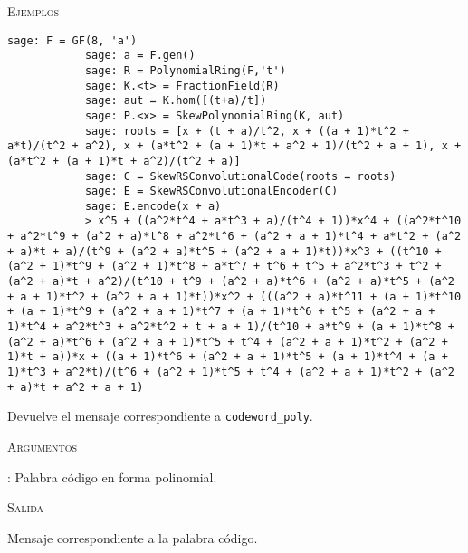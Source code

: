 \begin{description}[leftmargin=1em, font=\normalfont\ttfamily, style=nextline]
\begin{description}[font=\ttfamily,style=nextline]
        \textsc{Ejemplos}

        \begin{lstlisting}[gobble=10]
            sage: F = GF(8, 'a')
            sage: a = F.gen()
            sage: R = PolynomialRing(F,'t')
            sage: K.<t> = FractionField(R)
            sage: aut = K.hom([(t+a)/t])
            sage: P.<x> = SkewPolynomialRing(K, aut)
            sage: roots = [x + (t + a)/t^2, x + ((a + 1)*t^2 + a*t)/(t^2 + a^2), x + (a*t^2 + (a + 1)*t + a^2 + 1)/(t^2 + a + 1), x + (a*t^2 + (a + 1)*t + a^2)/(t^2 + a)]
            sage: C = SkewRSConvolutionalCode(roots = roots) 
            sage: E = SkewRSConvolutionalEncoder(C)
            sage: E.encode(x + a)
            > x^5 + ((a^2*t^4 + a*t^3 + a)/(t^4 + 1))*x^4 + ((a^2*t^10 + a^2*t^9 + (a^2 + a)*t^8 + a^2*t^6 + (a^2 + a + 1)*t^4 + a*t^2 + (a^2 + a)*t + a)/(t^9 + (a^2 + a)*t^5 + (a^2 + a + 1)*t))*x^3 + ((t^10 + (a^2 + 1)*t^9 + (a^2 + 1)*t^8 + a*t^7 + t^6 + t^5 + a^2*t^3 + t^2 + (a^2 + a)*t + a^2)/(t^10 + t^9 + (a^2 + a)*t^6 + (a^2 + a)*t^5 + (a^2 + a + 1)*t^2 + (a^2 + a + 1)*t))*x^2 + (((a^2 + a)*t^11 + (a + 1)*t^10 + (a + 1)*t^9 + (a^2 + a + 1)*t^7 + (a + 1)*t^6 + t^5 + (a^2 + a + 1)*t^4 + a^2*t^3 + a^2*t^2 + t + a + 1)/(t^10 + a*t^9 + (a + 1)*t^8 + (a^2 + a)*t^6 + (a^2 + a + 1)*t^5 + t^4 + (a^2 + a + 1)*t^2 + (a^2 + 1)*t + a))*x + ((a + 1)*t^6 + (a^2 + a + 1)*t^5 + (a + 1)*t^4 + (a + 1)*t^3 + a^2*t)/(t^6 + (a^2 + 1)*t^5 + t^4 + (a^2 + a + 1)*t^2 + (a^2 + a)*t + a^2 + a + 1)
        \end{lstlisting}        
    \end{description}

    \begin{description}[font=\ttfamily,style=nextline]
        \item[unencode(self,codeword\_poly)] 
        Devuelve el mensaje correspondiente a \texttt{codeword\_poly}.

        \textsc{Argumentos}

        \begin{description}[font=\normalfont\ttfamily]
            \item[codeword\_poly]: Palabra código en forma polinomial. 
        \end{description}

        \textsc{Salida}

        \begin{description}[font=\normalfont\ttfamily]
            \item[] Mensaje correspondiente a la palabra código.
        \end{description}


\end{description}
\end{description}
